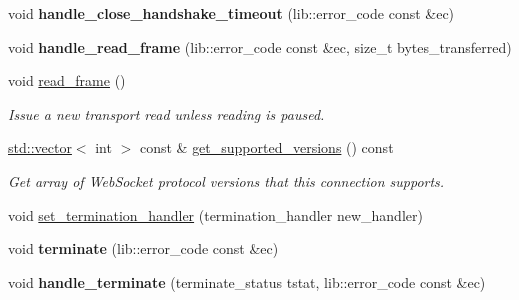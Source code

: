 \begin{DoxyCompactItemize}
\item 
\mbox{\label{classwebsocketpp_1_1connection_a129554b75156c82eb22b22e4409392c8}} 
void {\bfseries handle\+\_\+close\+\_\+handshake\+\_\+timeout} (lib\+::error\+\_\+code const \&ec)
\item 
\mbox{\label{classwebsocketpp_1_1connection_abd6866c41c2ae86c3372cf428392a190}} 
void {\bfseries handle\+\_\+read\+\_\+frame} (lib\+::error\+\_\+code const \&ec, size\+\_\+t bytes\+\_\+transferred)
\item 
\mbox{\label{classwebsocketpp_1_1connection_af54e9d7c8ef07349d28c3405182bb3c7}} 
void \mbox{\hyperlink{classwebsocketpp_1_1connection_af54e9d7c8ef07349d28c3405182bb3c7}{read\+\_\+frame}} ()
\begin{DoxyCompactList}\small\item\em Issue a new transport read unless reading is paused. \end{DoxyCompactList}\item 
\mbox{\label{classwebsocketpp_1_1connection_a588af194b5c2a13fe692452c207e0cba}} 
\mbox{\hyperlink{classstd_1_1vector}{std\+::vector}}$<$ int $>$ const  \& \mbox{\hyperlink{classwebsocketpp_1_1connection_a588af194b5c2a13fe692452c207e0cba}{get\+\_\+supported\+\_\+versions}} () const
\begin{DoxyCompactList}\small\item\em Get array of Web\+Socket protocol versions that this connection supports. \end{DoxyCompactList}\item 
void \mbox{\hyperlink{classwebsocketpp_1_1connection_ac72ff8473d0a49bb069825e99e99ca9d}{set\+\_\+termination\+\_\+handler}} (termination\+\_\+handler new\+\_\+handler)
\item 
\mbox{\label{classwebsocketpp_1_1connection_a7267aae677a77e5e9379ecb6db1789a3}} 
void {\bfseries terminate} (lib\+::error\+\_\+code const \&ec)
\item 
\mbox{\label{classwebsocketpp_1_1connection_a5012a184129c08ea3f6cfa377e1770c1}} 
void {\bfseries handle\+\_\+terminate} (terminate\+\_\+status tstat, lib\+::error\+\_\+code const \&ec)

\end{DoxyCompactItemize}

